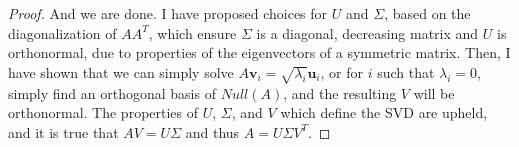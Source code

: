 \documentclass[draft,12pt]{report}
\renewcommand{\vec}[1]{\mathbf{#1}}
\begin{document}
\begin{proof}
    And we are done. I have proposed choices for $U$ and $\Sigma$, based on the diagonalization of $AA^T$, which ensure $\Sigma$ is a diagonal, decreasing matrix and $U$ is orthonormal, due to properties of the eigenvectors of a symmetric matrix. Then, I have shown that we can simply solve $A\vec{v}_i = \sqrt{\lambda_i}\vec{u}_i$, or for $i$ such that $\lambda_i = 0$, simply find an orthogonal basis of $Null(A)$, and the resulting $V$ will be orthonormal. The properties of $U$, $\Sigma$, and $V$ which define the SVD are upheld, and it is true that $AV = U\Sigma$ and thus $A = U\Sigma V^T$.
\end{proof}




\end{document}

